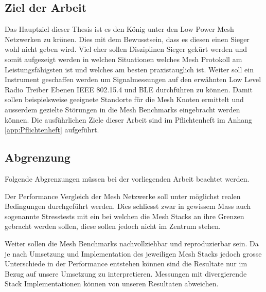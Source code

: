 \subsection{Ziel der Arbeit}\label{subsec:ZielderArbeit}

Das Hauptziel dieser Thesis ist es den König unter den Low Power Mesh Netzwerken zu krönen. Dies mit dem Bewusstsein, dass es diesen einen Sieger wohl nicht geben wird. Viel eher sollen Disziplinen Sieger gekürt werden und somit aufgezeigt werden in welchen Situationen welches Mesh Protokoll am Leistungsfähigsten ist und welches am besten praxistauglich ist.
Weiter soll ein Instrument geschaffen werden um Signalmessungen auf den erwähnten Low Level Radio Treiber Ebenen IEEE 802.15.4 und BLE durchführen zu können. Damit sollen beispielsweise geeignete Standorte für die Mesh Knoten ermittelt und ausserdem gezielte Störungen in die Mesh Benchmarks eingebracht werden können.
Die ausführlichen Ziele dieser Arbeit sind im Pflichtenheft im Anhang \ref{app:Pflichtenheft} aufgeführt.


\subsection{Abgrenzung}\label{sec:Abgrenzung}

Folgende Abgrenzungen müssen bei der vorliegenden Arbeit beachtet werden.

Der Performance Vergleich der Mesh Netzwerke soll unter möglichst realen Bedingungen durchgeführt werden. Dies schliesst zwar in gewissem Mass auch sogenannte Stresstests mit ein bei welchen die Mesh Stacks an ihre Grenzen gebracht werden sollen, diese sollen jedoch nicht im Zentrum stehen.

Weiter sollen die Mesh Benchmarks nachvollziehbar und reproduzierbar sein. Da je nach Umsetzung und Implementation des jeweiligen Mesh Stacks jedoch grosse Unterschiede in der Performance entstehen können sind die Resultate nur im Bezug auf unsere Umsetzung zu interpretieren. Messungen mit divergierende Stack Implementationen können von unseren Resultaten abweichen.

